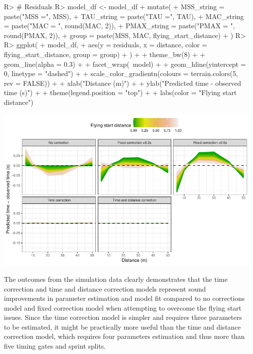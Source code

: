 \documentclass[
]{jss}
\begin{document}
\begin{CodeChunk}
\begin{CodeInput}
R> # Residuals
R> model_df <- model_df %
+   mutate(
+     MSS_string = paste("MSS =", MSS),
+     TAU_string = paste("TAU =", TAU),
+     MAC_string = paste("MAC = ", round(MAC, 2)),
+     PMAX_string = paste("PMAX = ", round(PMAX, 2)),
+     group = paste(MSS, MAC, flying_start_distance)
+   )
R> 
R> ggplot(
+   model_df,
+   aes(y = residuals, x = distance, color = flying_start_distance, group = group)
+ ) +
+   theme_bw(8) +
+   geom_line(alpha = 0.3) +
+   facet_wrap(~model) +
+   geom_hline(yintercept = 0, linetype = "dashed") +
+   scale_color_gradientn(colours = terrain.colors(5, rev = FALSE)) +
+   xlab("Distance (m)") +
+   ylab("Predicted time - observed time (s)") +
+   theme(legend.position = "top") + 
+   labs(color = "Flying start distance")
\end{CodeInput}


\begin{center}\includegraphics[width=1\linewidth]{paper_files/figure-latex/unnamed-chunk-37-1} \end{center}

\end{CodeChunk}

The outcomes from the simulation data clearly demonstrates that the time correction and time and distance correction models represent sound improvements in parameter estimation and model fit compared to no corrections model and fixed correction model when attempting to overcome the flying start issues. Since the time correction model is simpler and requires three parameters to be estimated, it might be practically more useful than the time and distance correction model, which requires four parameters estimation and thus more than five timing gates and sprint splits.
\end{document}
